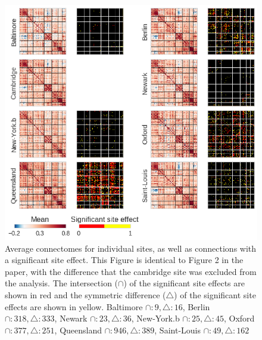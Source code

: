 \documentclass[authoryear]{elsarticle}
\begin{document}
\begin{figure}[htbp]
\begin{center}
\includegraphics[width=\linewidth]{../figures/connectome_multisite_no_cambridge.png}
\end{center}
\caption[]{
Average connectomes for individual sites, as well as connections with a significant site effect. This Figure is identical to Figure 2 in the paper, with the difference that the cambridge site was excluded from the analysis. The intersection ($\cap$) of the significant site effects are shown in red and the symmetric difference ($\bigtriangleup$) of the significant site effects are shown in yellow. Baltimore $\cap:9,\bigtriangleup:16$, Berlin $\cap:318,\bigtriangleup:333$, Newark $\cap:23,\bigtriangleup:36$, New-York.b $\cap:25,\bigtriangleup:45$, Oxford $\cap:377,\bigtriangleup:251$, Queensland $\cap:946,\bigtriangleup:389$, Saint-Louis $\cap:49,\bigtriangleup:162$
}
\label{fig_connectome_variability_no_cambridge}
\end{figure}
\end{document}
